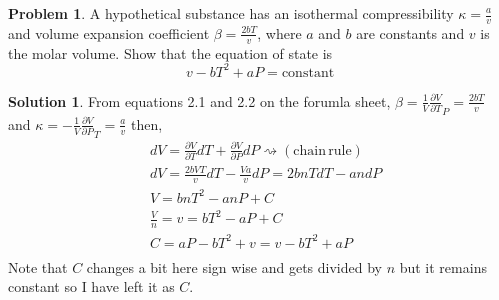 \documentclass[10pt]{article}
\theoremstyle{definition}
\newtheorem{problem}{Problem}
\newtheorem{soln}{Solution}
\begin{document}
\begin{problem}
A hypothetical substance has an isothermal compressibility $\kappa = \frac{a}{v}$ and volume expansion coefficient $\beta=\frac{2bT}{v}$,
where $a$ and $b$ are constants and $v$ is the molar volume. Show that the equation of state is $$v-bT^2+aP=\mathrm{constant}$$
\end{problem}
\begin{soln}
  From equations 2.1 and 2.2 on the forumla sheet, $\displaystyle\beta=\frac{1}{V}\frac{\partial V}{\partial T}_P=\frac{2bT}{v}$ and
  $\displaystyle\kappa=-\frac{1}{V}\frac{\partial V}{\partial P}_T=\frac{a}{v}$ then,
  \begin{align*}
     & dV=\frac{\partial V}{\partial T}dT+\frac{\partial V}{\partial P}dP\rightsquigarrow\mathrm{ (chain\,rule)} \\
     & dV=\frac{2bVT}{v}dT-\frac{Va}{v}dP=2bnTdT-andP                                                            \\
     & V=bnT^2-anP+C                                                                                             \\
     & \frac{V}{n}=v=bT^2-aP+C                                                                                   \\
     & C=aP-bT^2+v=v-bT^2+aP                                                                                     \\
  \end{align*}
  Note that $C$ changes a bit here sign wise and gets divided by $n$ but it remains constant so I have left it as $C$.
\end{soln}
\end{document}
